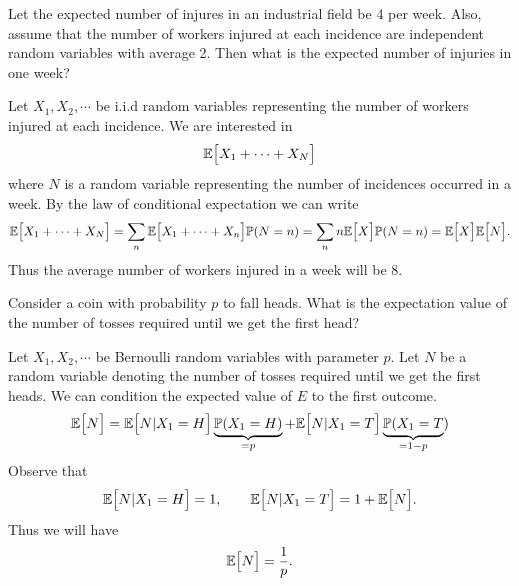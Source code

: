 \begin{problem}
	Let the expected number of injures in an industrial field be 4 per week. Also, assume that the number of workers injured at each incidence are independent random variables with average 2. Then what is the expected number of injuries in one week?
\end{problem}
\begin{solution}
	Let $ X_1,X_2,\cdots $ be i.i.d random variables representing the number of workers injured at each incidence. We are interested in 
	\[ \mathbb{E}\big[X_1+\cdots+X_N\big] \]
	where $ N $ is a random variable representing the number of incidences occurred in a week. By the law of conditional expectation we can write
	\[ \mathbb{E}\big[X_1 + \cdots + X_N\big] = \sum_n \mathbb{E}\big[X_1+\cdots+X_n\big]\mathbb{P}(N=n) = \sum_n n\mathbb{E}\big[X\big] \mathbb{P}(N=n) = \mathbb{E}\big[X\big] \mathbb{E}\big[N\big].\]
	Thus the average number of workers injured in a week will be 8. 
\end{solution}

\begin{problem}
	Consider a coin with probability $ p $ to fall heads. What is the expectation value of the number of tosses required until we get the first head?
\end{problem}
\begin{solution}
	Let $ X_1,X_2,\cdots $ be Bernoulli random variables with parameter $ p $. Let $ N $ be a random variable denoting the number of tosses required until we get the first heads. We can condition the expected value of $ E $ to the first outcome.
	\[ \mathbb{E}\big[N\big] = \mathbb{E}\big[N|X_1 = H \big]\underbrace{\mathbb{P}(X_1 = H)}_{=p} + \mathbb{E}\big[N|X_1=T\big]\underbrace{\mathbb{P}(X_1=T}_{=1-p})  \]
	Observe that 
	\[ \mathbb{E}\big[N|X_1=H\big] =1 ,\qquad \mathbb{E}\big[N|X_1=T\big] = 1+\mathbb{E}\big[N\big].\]
	Thus we will have
	\[ \mathbb{E}\big[N\big] = \frac{1}{p}. \]
\end{solution}

